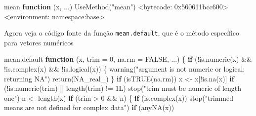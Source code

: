 \documentclass[
  10pt,
  a4paper]{book}
\newenvironment{Shaded}{\begin{snugshade}}{\end{snugshade}}
\newcommand{\AttributeTok}[1]{\textcolor[rgb]{0.77,0.63,0.00}{#1}}
\newcommand{\ConstantTok}[1]{\textcolor[rgb]{0.00,0.00,0.00}{#1}}
\newcommand{\ControlFlowTok}[1]{\textcolor[rgb]{0.13,0.29,0.53}{\textbf{#1}}}
\newcommand{\DecValTok}[1]{\textcolor[rgb]{0.00,0.00,0.81}{#1}}
\newcommand{\ErrorTok}[1]{\textcolor[rgb]{0.64,0.00,0.00}{\textbf{#1}}}
\newcommand{\FunctionTok}[1]{\textcolor[rgb]{0.00,0.00,0.00}{#1}}
\newcommand{\NormalTok}[1]{#1}
\newcommand{\OtherTok}[1]{\textcolor[rgb]{0.56,0.35,0.01}{#1}}
\newcommand{\SpecialCharTok}[1]{\textcolor[rgb]{0.00,0.00,0.00}{#1}}
\newcommand{\StringTok}[1]{\textcolor[rgb]{0.31,0.60,0.02}{#1}}
\begin{document}
\begin{Shaded}
\begin{Highlighting}[]
\NormalTok{mean}
\ControlFlowTok{function}\NormalTok{ (x, ...) }
\FunctionTok{UseMethod}\NormalTok{(}\StringTok{"mean"}\NormalTok{)}
\SpecialCharTok{\textless{}}\NormalTok{bytecode}\SpecialCharTok{:} \DecValTok{0x560611bcc600}\SpecialCharTok{\textgreater{}}
\ErrorTok{\textless{}}\NormalTok{environment}\SpecialCharTok{:}\NormalTok{ namespace}\SpecialCharTok{:}\NormalTok{base}\SpecialCharTok{\textgreater{}}
\end{Highlighting}
\end{Shaded}

Agora veja o código fonte da função \texttt{mean.default}, que é o método
específico para vetores numéricos

\begin{Shaded}
\begin{Highlighting}[]
\NormalTok{mean.default}
\ControlFlowTok{function}\NormalTok{ (x, }\AttributeTok{trim =} \DecValTok{0}\NormalTok{, }\AttributeTok{na.rm =} \ConstantTok{FALSE}\NormalTok{, ...) }
\NormalTok{\{}
    \ControlFlowTok{if}\NormalTok{ (}\SpecialCharTok{!}\FunctionTok{is.numeric}\NormalTok{(x) }\SpecialCharTok{\&\&} \SpecialCharTok{!}\FunctionTok{is.complex}\NormalTok{(x) }\SpecialCharTok{\&\&} \SpecialCharTok{!}\FunctionTok{is.logical}\NormalTok{(x)) \{}
        \FunctionTok{warning}\NormalTok{(}\StringTok{"argument is not numeric or logical: returning NA"}\NormalTok{)}
        \FunctionTok{return}\NormalTok{(}\ConstantTok{NA\_real\_}\NormalTok{)}
\NormalTok{    \}}
    \ControlFlowTok{if}\NormalTok{ (}\FunctionTok{isTRUE}\NormalTok{(na.rm)) }
\NormalTok{        x }\OtherTok{\textless{}{-}}\NormalTok{ x[}\SpecialCharTok{!}\FunctionTok{is.na}\NormalTok{(x)]}
    \ControlFlowTok{if}\NormalTok{ (}\SpecialCharTok{!}\FunctionTok{is.numeric}\NormalTok{(trim) }\SpecialCharTok{||} \FunctionTok{length}\NormalTok{(trim) }\SpecialCharTok{!=}\NormalTok{ 1L) }
        \FunctionTok{stop}\NormalTok{(}\StringTok{"\textquotesingle{}trim\textquotesingle{} must be numeric of length one"}\NormalTok{)}
\NormalTok{    n }\OtherTok{\textless{}{-}} \FunctionTok{length}\NormalTok{(x)}
    \ControlFlowTok{if}\NormalTok{ (trim }\SpecialCharTok{\textgreater{}} \DecValTok{0} \SpecialCharTok{\&\&}\NormalTok{ n) \{}
        \ControlFlowTok{if}\NormalTok{ (}\FunctionTok{is.complex}\NormalTok{(x)) }
            \FunctionTok{stop}\NormalTok{(}\StringTok{"trimmed means are not defined for complex data"}\NormalTok{)}
        \ControlFlowTok{if}\NormalTok{ (}\FunctionTok{anyNA}\NormalTok{(x)) }

\end{Highlighting}
\end{Shaded}
\end{document}
